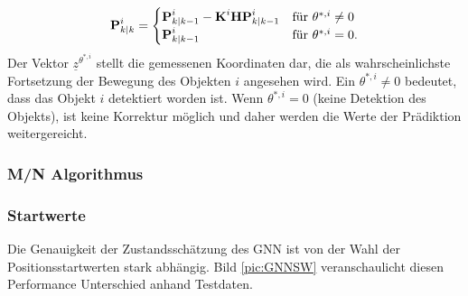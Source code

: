 \documentclass[10pt,a4paper]{article}
\begin{document}
\begin{equation*}
\textbf{P}^i_{k|k} = \begin{cases}
\textbf{P}^i_{k|k-1}-\textbf{K}^i\textbf{H}\textbf{P}^i_{k|k-1} &$für $ \theta^{*,i} \neq 0 \\
\textbf{P}^i_{k|k-1} & $für $ \theta^{*,i} = 0.
\end{cases}
\end{equation*}
Der Vektor $\underline{z}^{\theta^{*,i}}$ stellt die gemessenen Koordinaten dar, die als wahrscheinlichste Fortsetzung der Bewegung des Objekten $i$ angesehen wird. Ein $ \theta^{*,i} \neq 0$ bedeutet, dass das Objekt $i$ detektiert worden ist. Wenn $\theta^{*,i} = 0$ (keine Detektion des Objekts), ist keine Korrektur möglich und daher werden die Werte der Prädiktion weitergereicht. 
\subsubsection{M/N Algorithmus}
\subsubsection{Startwerte}
Die Genauigkeit der Zustandsschätzung des GNN ist von der Wahl der Positionsstartwerten stark abhängig. Bild \ref{pic:GNNSW} veranschaulicht diesen Performance Unterschied anhand  Testdaten. \\
\end{document}
